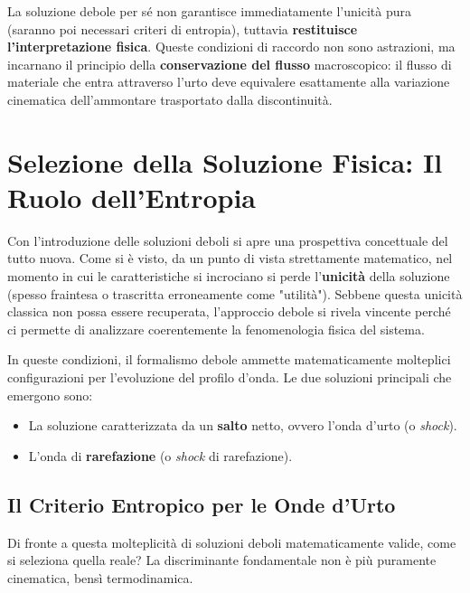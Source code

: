 La soluzione debole per sé non garantisce immediatamente l'unicità pura (saranno poi necessari criteri di entropia), tuttavia \textbf{restituisce l'interpretazione fisica}. Queste condizioni di raccordo non sono astrazioni, ma incarnano il principio della \textbf{conservazione del flusso} macroscopico: il flusso di materiale che entra attraverso l'urto deve equivalere esattamente alla variazione cinematica dell'ammontare trasportato dalla discontinuità.

\section{Selezione della Soluzione Fisica: Il Ruolo dell'Entropia}

Con l'introduzione delle soluzioni deboli si apre una prospettiva concettuale del tutto nuova. Come si è visto, da un punto di vista strettamente matematico, nel momento in cui le caratteristiche si incrociano si perde l'\textbf{unicità} della soluzione (spesso fraintesa o trascritta erroneamente come "utilità"). Sebbene questa unicità classica non possa essere recuperata, l'approccio debole si rivela vincente perché ci permette di analizzare coerentemente la fenomenologia fisica del sistema.

In queste condizioni, il formalismo debole ammette matematicamente molteplici configurazioni per l'evoluzione del profilo d'onda. Le due soluzioni principali che emergono sono:
\begin{itemize}
\item La soluzione caratterizzata da un \textbf{salto} netto, ovvero l'onda d'urto (o \textit{shock}).
\item L'onda di \textbf{rarefazione} (o \textit{shock} di rarefazione).
\end{itemize}

\subsection{Il Criterio Entropico per le Onde d'Urto}

Di fronte a questa molteplicità di soluzioni deboli matematicamente valide, come si seleziona quella reale? La discriminante fondamentale non è più puramente cinematica, bensì termodinamica.

